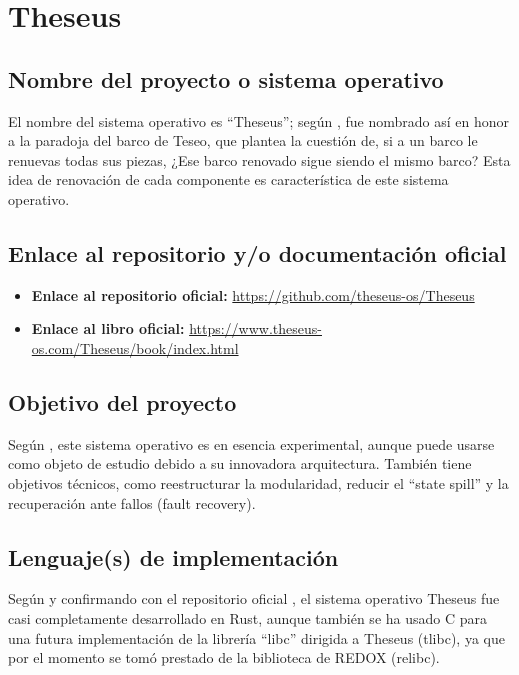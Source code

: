 \section{Theseus}

\subsection{Nombre del proyecto o sistema operativo}
El nombre del sistema operativo es ``Theseus''; según \citep{theseus2023}, fue nombrado así en honor a la paradoja del barco de Teseo, que plantea la cuestión de, si a un barco le renuevas todas sus piezas, ¿Ese barco renovado sigue siendo el mismo barco? Esta idea de renovación de cada componente es característica de este sistema operativo.

\subsection{Enlace al repositorio y/o documentación oficial}
\begin{itemize}
    \item \textbf{Enlace al repositorio oficial:} \url{https://github.com/theseus-os/Theseus} 
    \item \textbf{Enlace al libro oficial:} \url{https://www.theseus-os.com/Theseus/book/index.html}
\end{itemize}

\subsection{Objetivo del proyecto}
Según \citep{boos2020theseus}, este sistema operativo es en esencia experimental, aunque puede usarse como objeto de estudio debido a su innovadora arquitectura. También tiene objetivos técnicos, como reestructurar la modularidad, reducir el ``state spill'' y la recuperación ante fallos (fault recovery).

\subsection{Lenguaje(s) de implementación}
Según \citep{boos2020theseus} y confirmando con el repositorio oficial \citep{theseus_GitHub}, el sistema operativo Theseus fue casi completamente desarrollado en Rust, aunque también se ha usado C para una futura implementación de la librería ``libc'' dirigida a Theseus (tlibc), ya que por el momento se tomó prestado de la biblioteca de REDOX (relibc).

